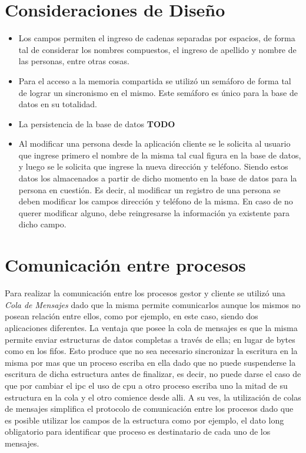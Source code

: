 \documentclass[11pt]{article}
\begin{document}
\section{Consideraciones de Dise\~no}

\begin{itemize}
\item Los campos permiten el ingreso de cadenas separadas por espacios, de forma tal de considerar los nombres compuestos, el ingreso de apellido y 
nombre de las personas, entre otras cosas.
\item Para el acceso a la memoria compartida se utiliz\'o un sem\'aforo de forma tal de lograr un sincronismo en el mismo. Este sem\'aforo es \'unico 
para la base de datos en su totalidad.
\item La persistencia de la base de datos {\bf TODO}
\item Al modificar una persona desde la aplicaci\'on cliente se le solicita al usuario que ingrese primero el nombre de la misma tal cual figura en la base de datos, 
y luego se le solicita que ingrese la nueva direcci\'on y tel\'efono. Siendo estos datos los almacenados a partir de dicho momento 
en la base de datos para la persona en cuesti\'on. Es decir, al modificar un registro de una persona se deben modificar los campos direcci\'on y tel\'efono de 
la misma. En caso de no querer modificar alguno, debe reingresarse la informaci\'on ya existente para dicho campo.

\end{itemize}


\section {Comunicaci\'on entre procesos}

Para realizar la comunicaci\'on entre los procesos gestor y cliente se utiliz\'o una \textit{Cola de Mensajes} dado que la misma permite comunicarlos 
aunque los mismos no posean relaci\'on entre ellos, como por ejemplo, en este caso, siendo dos aplicaciones diferentes. La ventaja que posee la 
cola de mensajes es que la misma permite enviar estructuras de datos completas a trav\'es de ella; en lugar de bytes como en los fifos.
Esto produce que no sea necesario sincronizar la escritura en la misma por mas que un proceso escriba en ella dado que no puede suspenderse la escritura 
de dicha estructura antes de finalizar, es decir, no puede darse el caso de que por cambiar el ipc el uso de cpu a otro proceso escriba uno la mitad de su estructura 
en la cola y el otro comience desde alli.
A su ves, la utilizaci\'on de colas de mensajes simplifica el protocolo de comunicaci\'on entre los procesos dado que es posible utilizar los campos de la estructura 
como por ejemplo, el dato long obligatorio para identificar que proceso es destinatario de cada uno de los mensajes.
\end{document}
